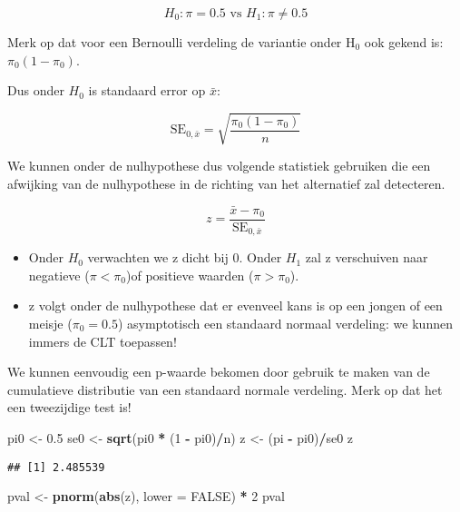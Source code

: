 \documentclass[
  12pt,dutch,coursenotes]{book}
\newenvironment{Shaded}{\begin{snugshade}}{\end{snugshade}}
\newcommand{\DataTypeTok}[1]{\textcolor[rgb]{0.13,0.29,0.53}{#1}}
\newcommand{\DecValTok}[1]{\textcolor[rgb]{0.00,0.00,0.81}{#1}}
\newcommand{\FloatTok}[1]{\textcolor[rgb]{0.00,0.00,0.81}{#1}}
\newcommand{\KeywordTok}[1]{\textcolor[rgb]{0.13,0.29,0.53}{\textbf{#1}}}
\newcommand{\NormalTok}[1]{#1}
\newcommand{\OperatorTok}[1]{\textcolor[rgb]{0.81,0.36,0.00}{\textbf{#1}}}
\newcommand{\OtherTok}[1]{\textcolor[rgb]{0.56,0.35,0.01}{#1}}
\newcommand{\StringTok}[1]{\textcolor[rgb]{0.31,0.60,0.02}{#1}}
\theoremstyle{definition}
\theoremstyle{definition}
\theoremstyle{definition}
\theoremstyle{remark}
\begin{document}
\[H_0: \pi = 0.5 \text{ vs } H_1: \pi \neq 0.5\]

Merk op dat voor een Bernoulli verdeling de variantie onder H\(_0\) ook gekend is: \(\pi_0 (1-\pi_0)\).

Dus onder \(H_0\) is standaard error op \(\bar x\):

\[
\text{SE}_{0, \bar x}=\sqrt{\frac{\pi_0 (1-\pi_0)}{n}}
\]

We kunnen onder de nulhypothese dus volgende statistiek gebruiken die een afwijking van de nulhypothese in de richting van het alternatief zal detecteren.

\[ z = \frac{\bar x - \pi_0}{\text{SE}_{0, \bar x}}\]

\begin{itemize}
\item
  Onder \(H_0\) verwachten we z dicht bij 0. Onder \(H_1\) zal z verschuiven naar negatieve (\(\pi < \pi_0\))of positieve waarden (\(\pi>\pi_0\)).
\item
  z volgt onder de nulhypothese dat er evenveel kans is op een jongen of een meisje (\(\pi_0=0.5\)) asymptotisch een standaard normaal verdeling: we kunnen immers de CLT toepassen!
\end{itemize}

We kunnen eenvoudig een p-waarde bekomen door gebruik te maken van de cumulatieve distributie van een standaard normale verdeling. Merk op dat het een tweezijdige test is!

\begin{Shaded}
\begin{Highlighting}[]
\NormalTok{pi0 \textless{}{-}}\StringTok{ }\FloatTok{0.5}
\NormalTok{se0 \textless{}{-}}\StringTok{ }\KeywordTok{sqrt}\NormalTok{(pi0 }\OperatorTok{*}\StringTok{ }\NormalTok{(}\DecValTok{1} \OperatorTok{{-}}\StringTok{ }\NormalTok{pi0)}\OperatorTok{/}\NormalTok{n)}
\NormalTok{z \textless{}{-}}\StringTok{ }\NormalTok{(pi }\OperatorTok{{-}}\StringTok{ }\NormalTok{pi0)}\OperatorTok{/}\NormalTok{se0}
\NormalTok{z}
\end{Highlighting}
\end{Shaded}

\begin{verbatim}
## [1] 2.485539
\end{verbatim}

\begin{Shaded}
\begin{Highlighting}[]
\NormalTok{pval \textless{}{-}}\StringTok{ }\KeywordTok{pnorm}\NormalTok{(}\KeywordTok{abs}\NormalTok{(z), }\DataTypeTok{lower =} \OtherTok{FALSE}\NormalTok{) }\OperatorTok{*}\StringTok{ }\DecValTok{2}
\NormalTok{pval}
\end{Highlighting}
\end{Shaded}
\end{document}
